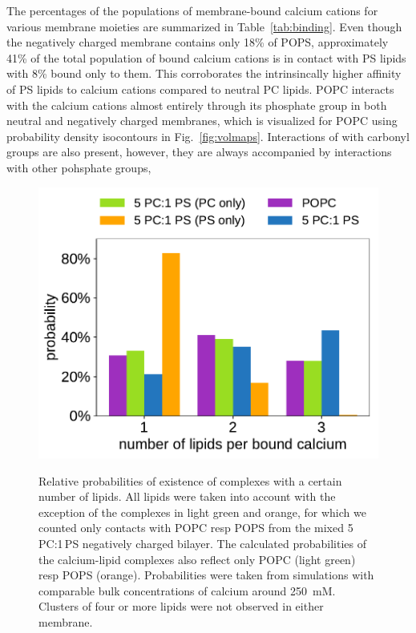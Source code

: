The percentages of the populations of membrane-bound calcium cations for various membrane moieties 
are summarized in Table~\ref{tab:binding}.
Even though the negatively charged membrane contains only 18\% of POPS, 
approximately 41\% of the total population of bound calcium cations is in contact with PS lipids
with 8\% bound only to them. 
This corroborates the intrinsincally higher affinity of PS lipids to calcium cations compared to neutral PC lipids. 
POPC interacts with the calcium cations almost entirely through its phosphate group 
in both neutral and negatively charged membranes, 
which is visualized for POPC using probability density isocontours in Fig.~\ref{fig:volmaps}.
Interactions of  with carbonyl groups are also present, 
however, they are always accompanied by interactions with other pohsphate groups, 



\begin{figure}[tb!] 
  \centering 
  \includegraphics[width=\figwidth]{../img/stoichiometry_CaCl2_comparison_Ecc-lipids_PC-vs-PCPS.pdf} \\ 
  \caption{\label{fig:cacl_complexes} 
      Relative probabilities of existence of  complexes 
      with a certain number of lipids.  
      All lipids were taken into account with the exception of the complexes in light green and orange, 
      for which we counted only contacts with POPC resp POPS from the mixed 5\,PC:1\,PS negatively charged bilayer. 
      The calculated probabilities of the calcium-lipid complexes also reflect only POPC (light green) resp POPS (orange). 
      Probabilities were taken from simulations with comparable bulk concentrations of calcium around 250~mM. 
      Clusters of four or more lipids were not observed in either membrane. 
  } 
\end{figure} 




